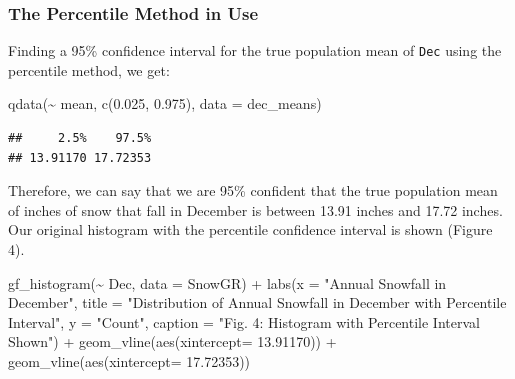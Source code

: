 \documentclass[12pt]{article}
\newenvironment{Shaded}{\begin{snugshade}}{\end{snugshade}}
\newcommand{\AttributeTok}[1]{\textcolor[rgb]{0.77,0.63,0.00}{#1}}
\newcommand{\FloatTok}[1]{\textcolor[rgb]{0.00,0.00,0.81}{#1}}
\newcommand{\FunctionTok}[1]{\textcolor[rgb]{0.00,0.00,0.00}{#1}}
\newcommand{\NormalTok}[1]{#1}
\newcommand{\SpecialCharTok}[1]{\textcolor[rgb]{0.00,0.00,0.00}{#1}}
\newcommand{\StringTok}[1]{\textcolor[rgb]{0.31,0.60,0.02}{#1}}
\begin{document}
\hypertarget{the-percentile-method-in-use}{%
\subsubsection{The Percentile Method in
Use}\label{the-percentile-method-in-use}}

Finding a 95\% confidence interval for the true population mean of
\texttt{Dec} using the percentile method, we get:

\begin{Shaded}
\begin{Highlighting}[]
\FunctionTok{qdata}\NormalTok{(}\SpecialCharTok{\textasciitilde{}}\NormalTok{ mean, }\FunctionTok{c}\NormalTok{(}\FloatTok{0.025}\NormalTok{, }\FloatTok{0.975}\NormalTok{), }\AttributeTok{data =}\NormalTok{ dec\_means)}
\end{Highlighting}
\end{Shaded}

\begin{verbatim}
##     2.5%    97.5% 
## 13.91170 17.72353
\end{verbatim}

Therefore, we can say that we are 95\% confident that the true
population mean of inches of snow that fall in December is between 13.91
inches and 17.72 inches. Our original histogram with the percentile
confidence interval is shown (Figure 4).

\begin{Shaded}
\begin{Highlighting}[]
\FunctionTok{gf\_histogram}\NormalTok{(}\SpecialCharTok{\textasciitilde{}}\NormalTok{ Dec, }\AttributeTok{data =}\NormalTok{ SnowGR) }\SpecialCharTok{+}
  \FunctionTok{labs}\NormalTok{(}\AttributeTok{x =} \StringTok{"Annual Snowfall in December"}\NormalTok{, }
       \AttributeTok{title =} \StringTok{"Distribution of Annual Snowfall in December}
\StringTok{       with Percentile Interval"}\NormalTok{, }\AttributeTok{y =} \StringTok{"Count"}\NormalTok{,}
       \AttributeTok{caption =} \StringTok{"Fig. 4: Histogram with Percentile Interval Shown"}\NormalTok{) }\SpecialCharTok{+}
  \FunctionTok{geom\_vline}\NormalTok{(}\FunctionTok{aes}\NormalTok{(}\AttributeTok{xintercept=} \FloatTok{13.91170}\NormalTok{)) }\SpecialCharTok{+}
  \FunctionTok{geom\_vline}\NormalTok{(}\FunctionTok{aes}\NormalTok{(}\AttributeTok{xintercept=} \FloatTok{17.72353}\NormalTok{))}
\end{Highlighting}
\end{Shaded}
\end{document}
